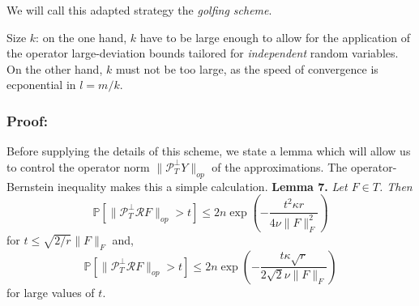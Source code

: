 \documentclass{article}
\begin{document}
We will call this adapted strategy the {\color{red}\textit{golfing scheme}}.

Size $k$: on the one hand, $k$ have to be large enough to allow for the application of the operator large-deviation bounds tailored for \textit{independent} random variables. On the other hand, $k$ must not be too large, as the speed of convergence is ecponential in $l = m/k$.

\subsubsection{Proof:}Before supplying the details of this scheme, we state a lemma which will allow us to control the operator norm $\|\mathcal{P}_T^\perp Y\|_{op}$ of the approximations. The operator-Bernstein inequality makes this a simple calculation.
\textbf{Lemma 7.} \textit{Let $F\in T$. Then}
\[
\mathbb{P}\left[ \| \mathcal{P}_T^\perp \mathcal{R}F\|_{op} > t\right] \le 2n \exp \left( -\dfrac{t^2\kappa r}{4\nu \|F\|_F^2}\right)
\]
for $t \le \sqrt{2/r}\|F\|_F$ and,
\[
\mathbb{P}\left[ \| \mathcal{P}_T^\perp \mathcal{R}F\|_{op} > t\right] \le 2n \exp \left( -\dfrac{t\kappa \sqrt{r}}{2\sqrt{2}\nu \|F\|_F}\right)
\]
for large values of $t$.
\end{document}
